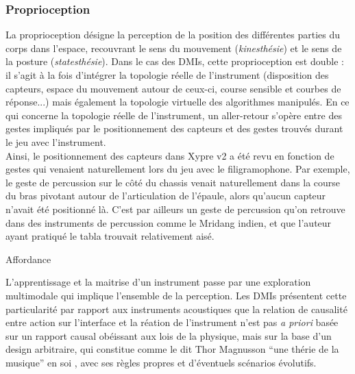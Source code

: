 \subsubsection{Proprioception}

\noindent La proprioception désigne la perception de la position des différentes parties du corps dans l'espace, recouvrant le sens du mouvement (\textit{kinesthésie}) et le sens de la posture (\textit{statesthésie}). Dans le cas des \glspl{DMI}, cette proprioception est double : il s'agit à la fois d'intégrer la topologie réelle de l'instrument (disposition des capteurs, espace du mouvement autour de ceux-ci, course sensible et courbes de réponse...) mais également la topologie virtuelle des algorithmes manipulés. En ce qui concerne la topologie réelle de l'instrument, un aller-retour s'opère entre des gestes impliqués par le positionnement des capteurs et des gestes trouvés durant le jeu avec l'instrument.\\
\indent Ainsi, le positionnement des capteurs dans Xypre v2 a été revu en fonction de gestes qui venaient naturellement lors du jeu avec le filigramophone. Par exemple, le geste de percussion sur le côté du chassis venait naturellement dans la course du bras pivotant autour de l'articulation de l'épaule, alors qu'aucun capteur n'avait été positionné là. C'est par ailleurs un geste de percussion qu'on retrouve dans des instruments de percussion comme le Mridang indien, et que l'auteur ayant pratiqué le tabla trouvait relativement aisé.

 \cite{bin_hands_2017}

Affordance

\noindent L'apprentissage et la maitrise d'un instrument passe par une exploration multimodale qui implique l'ensemble de la perception. Les \glspl{DMI} présentent cette particularité par rapport aux instruments acoustiques que la relation de causalité entre action sur l'interface et la réation de l'instrument n'est pas \textit{a priori} basée sur un rapport causal obéissant aux lois de la physique, mais sur la base d'un design arbitraire, qui constitue comme le dit Thor Magnusson ``une thérie de la musique'' en soi \cite{magnusson_sonic_2019}, avec ses règles propres et d'éventuels scénarios évolutifs.

